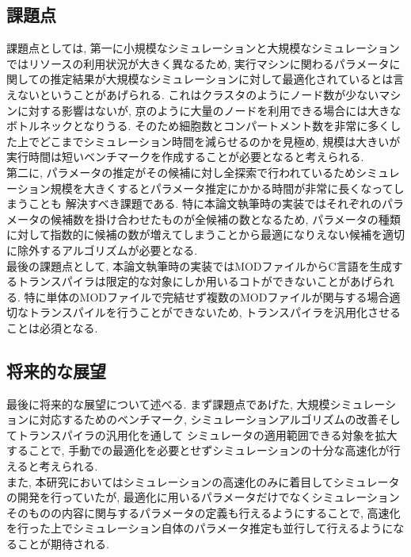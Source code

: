 \subsection{課題点}
課題点としては, 第一に小規模なシミュレーションと大規模なシミュレーションではリソースの利用状況が大きく異なるため,
実行マシンに関わるパラメータに関しての推定結果が大規模なシミュレーションに対して最適化されているとは言えないということがあげられる.
これはクラスタのようにノード数が少ないマシンに対する影響はないが, 京のように大量のノードを利用できる場合には大きなボトルネックとなりうる.
そのため細胞数とコンパートメント数を非常に多くした上でどこまでシミュレーション時間を減らせるのかを見極め,
規模は大きいが実行時間は短いベンチマークを作成することが必要となると考えられる.\\
第二に, パラメータの推定がその候補に対し全探索で行われているためシミュレーション規模を大きくするとパラメータ推定にかかる時間が非常に長くなってしまうことも
解決すべき課題である. 特に本論文執筆時の実装ではそれぞれのパラメータの候補数を掛け合わせたものが全候補の数となるため,
パラメータの種類に対して指数的に候補の数が増えてしまうことから最適になりえない候補を適切に除外するアルゴリズムが必要となる.\\
最後の課題点として, 本論文執筆時の実装ではMODファイルからC言語を生成するトランスパイラは限定的な対象にしか用いるコトができないことがあげられる.
特に単体のMODファイルで完結せず複数のMODファイルが関与する場合適切なトランスパイルを行うことができないため,
トランスパイラを汎用化させることは必須となる.\\

\subsection{将来的な展望}
最後に将来的な展望について述べる.
まず課題点であげた, 大規模シミュレーションに対応するためのベンチマーク, シミュレーションアルゴリズムの改善そしてトランスパイラの汎用化を通して
シミュレータの適用範囲できる対象を拡大することで, 手動での最適化を必要とせずシミュレーションの十分な高速化が行えると考えられる.\\
また, 本研究においてはシミュレーションの高速化のみに着目してシミュレータの開発を行っていたが,
最適化に用いるパラメータだけでなくシミュレーションそのものの内容に関与するパラメータの定義も行えるようにすることで,
高速化を行った上でシミュレーション自体のパラメータ推定も並行して行えるようになることが期待される.\\
